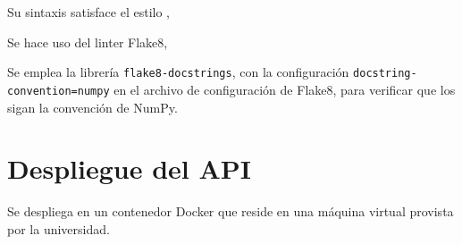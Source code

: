 Su sintaxis satisface el estilo ,

Se hace uso del \gls{linter} \gls{Flake8},

Se emplea la librería \verb|flake8-docstrings|, con la configuración \verb|docstring-convention=numpy| en el archivo de configuración de \gls{Flake8}, para verificar que los  sigan la convención de \gls{NumPy}.

\section{Despliegue del API}
\label{sec:despliegue_api}

Se despliega en un contenedor Docker que reside en una máquina virtual provista por la universidad.
